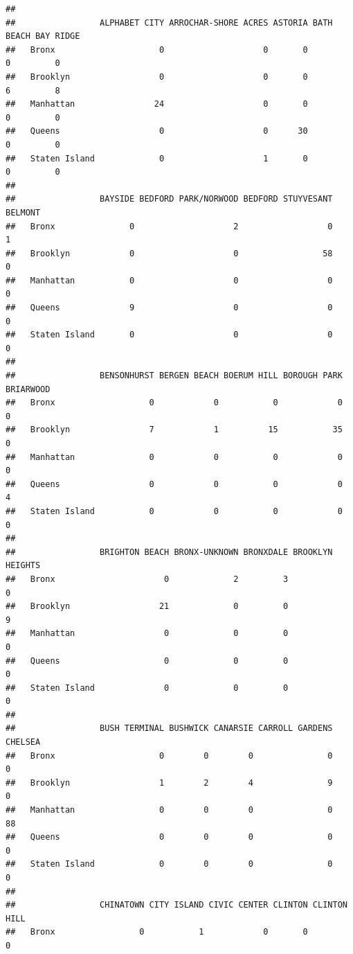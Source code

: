 \documentclass[
]{article}
\begin{document}
\begin{verbatim}
##                
##                 ALPHABET CITY ARROCHAR-SHORE ACRES ASTORIA BATH BEACH BAY RIDGE
##   Bronx                     0                    0       0          0         0
##   Brooklyn                  0                    0       0          6         8
##   Manhattan                24                    0       0          0         0
##   Queens                    0                    0      30          0         0
##   Staten Island             0                    1       0          0         0
##                
##                 BAYSIDE BEDFORD PARK/NORWOOD BEDFORD STUYVESANT BELMONT
##   Bronx               0                    2                  0       1
##   Brooklyn            0                    0                 58       0
##   Manhattan           0                    0                  0       0
##   Queens              9                    0                  0       0
##   Staten Island       0                    0                  0       0
##                
##                 BENSONHURST BERGEN BEACH BOERUM HILL BOROUGH PARK BRIARWOOD
##   Bronx                   0            0           0            0         0
##   Brooklyn                7            1          15           35         0
##   Manhattan               0            0           0            0         0
##   Queens                  0            0           0            0         4
##   Staten Island           0            0           0            0         0
##                
##                 BRIGHTON BEACH BRONX-UNKNOWN BRONXDALE BROOKLYN HEIGHTS
##   Bronx                      0             2         3                0
##   Brooklyn                  21             0         0                9
##   Manhattan                  0             0         0                0
##   Queens                     0             0         0                0
##   Staten Island              0             0         0                0
##                
##                 BUSH TERMINAL BUSHWICK CANARSIE CARROLL GARDENS CHELSEA
##   Bronx                     0        0        0               0       0
##   Brooklyn                  1        2        4               9       0
##   Manhattan                 0        0        0               0      88
##   Queens                    0        0        0               0       0
##   Staten Island             0        0        0               0       0
##                
##                 CHINATOWN CITY ISLAND CIVIC CENTER CLINTON CLINTON HILL
##   Bronx                 0           1            0       0            0

\end{verbatim}
\end{document}

